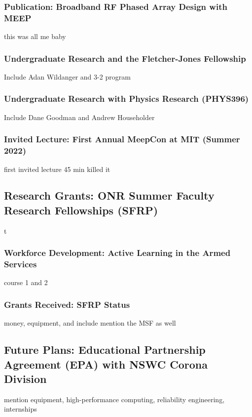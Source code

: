 \documentclass[../../../main.tex]{subfiles}
\begin{document}
\subsubsection{Publication: Broadband RF Phased Array Design with MEEP}
this was all me baby
\subsubsection{Undergraduate Research and the Fletcher-Jones Fellowship}
Include Adan Wildanger and 3-2 program
\subsubsection{Undergraduate Research with Physics Research (PHYS396)}
Include Dane Goodman and Andrew Householder
\subsubsection{Invited Lecture: First Annual MeepCon at MIT (Summer 2022)}
first invited lecture 45 min killed it
\subsection{Research Grants: ONR Summer Faculty Research Fellowships (SFRP)}
\label{sec:fellow}
t
\subsubsection{Workforce Development: Active Learning in the Armed Services}
course 1 and 2
\subsubsection{Grants Received: SFRP Status}
money, equipment, and include mention the MSF as well
\subsection{Future Plans: Educational Partnership Agreement (EPA) with NSWC Corona Division}
\label{sec:epa}
mention equipment, high-performance computing, reliability engineering, internships
\end{document}
